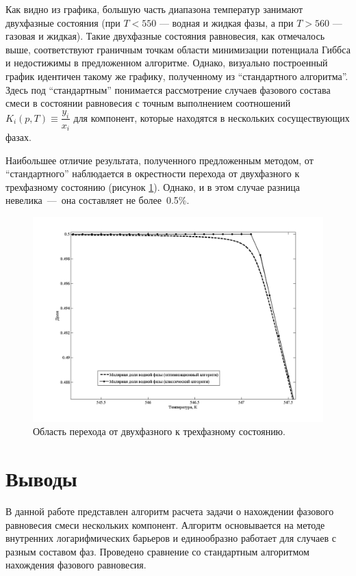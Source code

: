 \documentclass[12pt]{article}
\begin{document}
Как видно из графика, большую часть диапазона температур занимают двухфазные состояния (при $T<550$ --- водная и жидкая фазы, а при $T>560$ --- газовая и жидкая). Такие двухфазные состояния равновесия, как отмечалось выше, соответствуют граничным точкам области минимизации потенциала Гиббса и недостижимы в предложенном алгоритме. Однако, визуально построенный график идентичен такому же графику, полученному из ``стандартного алгоритма''. Здесь под ``стандартным'' понимается рассмотрение случаев  фазового состава смеси в состоянии равновесия с точным выполнением соотношений $K_i(p,T) \equiv \dfrac{y_i}{x_i}$ для компонент, которые находятся в нескольких сосуществующих фазах.

Наибольшее отличие результата, полученного предложенным методом, от ``стандартного'' наблюдается в окрестности перехода от двухфазного к трехфазному состоянию (рисунок \ref{fig:2}). Однако, и в этом случае разница невелика~---~она составляет не более~0.5\%.

\begin{figure}
	\centering
	\includegraphics[width=\textwidth]{Figure2.png}
	\caption{Область перехода от двухфазного к трехфазному состоянию.}
	\label{fig:2}
\end{figure}

\section{Выводы}
В данной работе представлен алгоритм расчета задачи о нахождении фазового равновесия смеси нескольких компонент. Алгоритм основывается на методе внутренних логарифмических барьеров и единообразно работает для случаев с разным составом фаз. Проведено сравнение со стандартным алгоритмом нахождения фазового равновесия.
\end{document}
